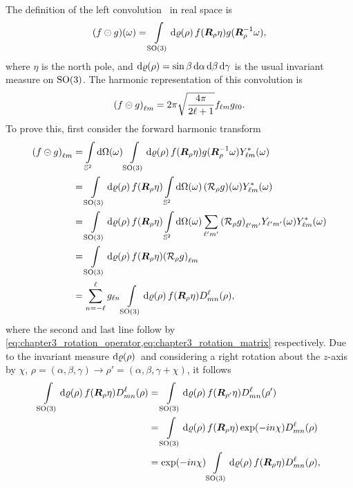 The definition of the left convolution~\cite{Kennedy2011,Driscoll1994} in real space is
%
\begin{equation}
	\pixel{(f \circleddash g)}
	= \integrateRotation{\rho} f(\rotationMatrix\eta) g(\rotationMatrix^{-1}\omega),
\end{equation}
%
where \({\eta}\) is the north pole, and \(\rotationVolume=\sin{\beta} \dd{\alpha} \dd{\beta} \dd{\gamma}\) is the usual invariant measure on \(\rotationGroup{}\).
The harmonic representation of this convolution is
%
\begin{equation}
	\harmonic{(f \circleddash g)}
	= 2\pi \sqrt{\inverseFactor} \harmonic{f} \axiHarmonic{g}.
\end{equation}
%
To prove this, first consider the forward harmonic transform
%
\begin{align}
	\harmonic{(f \circleddash g)}
	 & = \integrateSphere{\omega} \integrateRotation{\rho} f(\rotationMatrix\eta) g(\rotationMatrix^{-1}\omega) \pixel{\conj{\harmonic{Y}}} \nonumber{}                                            \\
	 & = \integrateRotation{\rho} f(\rotationMatrix\eta) \integrateSphere{\omega} \pixel{(\rotation{\rho}g)} \pixel{\conj{\harmonic{Y}}} \nonumber{}                                               \\
	 & = \integrateRotation{\rho} f(\rotationMatrix\eta) \integrateSphere{\omega} \harmonicSum['] \harmonic[']{(\rotation{\rho}g)} \pixel{\harmonic[']{Y}} \pixel{\conj{\harmonic{Y}}} \nonumber{} \\
	 & = \integrateRotation{\rho} f(\rotationMatrix\eta) \harmonic{(\rotation{\rho}g)} \nonumber{}                                                                                                 \\
	 & = \wignerSum g_{\ell n} \integrateRotation{\rho} f(\rotationMatrix\eta) \wigner{\ell}{m}{n}(\rho),
\end{align}
%
where the second and last line follow by \cref{eq:chapter3_rotation_operator,eq:chapter3_rotation_matrix} respectively.
Due to the invariant measure \(\rotationVolume{}\) and considering a right rotation about the \(z\)-axis by \({\chi}\), \ie{} \(\rho = (\alpha,\beta,\gamma) \rightarrow \rho' = (\alpha,\beta,\gamma+\chi)\), it follows
%
\begin{align}\label{eq:chapter3_so3_integral}
	\integrateRotation{\rho} f(\rotationMatrix\eta) \wigner{\ell}{m}{n}(\rho)
	 & = \integrateRotation{\rho} f(\rotationMatrix[']\eta) \wigner{\ell}{m}{n}(\rho') \nonumber{}            \\
	 & = \integrateRotation{\rho} f(\rotationMatrix\eta) \exp(-i n\chi) \wigner{\ell}{m}{n}(\rho) \nonumber{} \\
	 & = \exp(-i n\chi) \integrateRotation{\rho} f(\rotationMatrix\eta) \wigner{\ell}{m}{n}(\rho),
\end{align}
